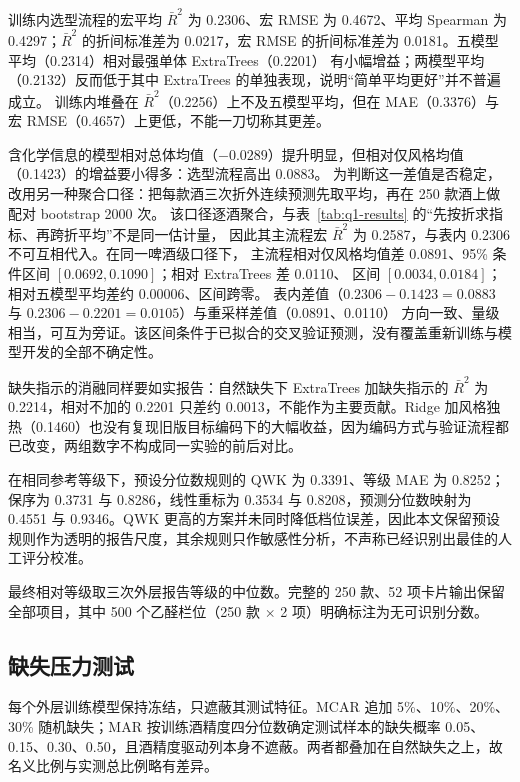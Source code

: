 \documentclass[UTF8,a4paper,zihao=-4]{ctexart}
\numberwithin{figure}{section}
\numberwithin{table}{section}
\numberwithin{equation}{section}
\begin{document}
训练内选型流程的宏平均 $\bar R^2$ 为 0.2306、宏 RMSE 为 0.4672、平均 Spearman 为 0.4297；$\bar R^2$ 
的折间标准差为 0.0217，宏 RMSE 的折间标准差为 0.0181。五模型平均（0.2314）相对最强单体 ExtraTrees（0.2201）
有小幅增益；两模型平均（0.2132）反而低于其中 ExtraTrees 的单独表现，说明“简单平均更好”并不普遍成立。
训练内堆叠在 $\bar R^2$（0.2256）上不及五模型平均，但在 MAE（0.3376）与宏 RMSE（0.4657）上更低，不能一刀切称其更差。

含化学信息的模型相对总体均值（$-0.0289$）提升明显，但相对仅风格均值（0.1423）的增益要小得多：选型流程高出 0.0883。
为判断这一差值是否稳定，改用另一种聚合口径：把每款酒三次折外连续预测先取平均，再在 250 款酒上做配对 bootstrap 2000 次。
该口径逐酒聚合，与表~\ref{tab:q1-results} 的“先按折求指标、再跨折平均”不是同一估计量，
因此其主流程宏 $\bar R^2$ 为 0.2587，与表内 0.2306 不可互相代入。在同一啤酒级口径下，
主流程相对仅风格均值差 0.0891、95\% 条件区间 $[0.0692,0.1090]$；相对 ExtraTrees 差 0.0110、
区间 $[0.0034,0.0184]$；相对五模型平均差约 0.00006、区间跨零。
表内差值（$0.2306-0.1423=0.0883$ 与 $0.2306-0.2201=0.0105$）与重采样差值（0.0891、0.0110）
方向一致、量级相当，可互为旁证。该区间条件于已拟合的交叉验证预测，没有覆盖重新训练与模型开发的全部不确定性。

缺失指示的消融同样要如实报告：自然缺失下 ExtraTrees 加缺失指示的 $\bar R^2$ 为 0.2214，相对不加的 0.2201 只差约 0.0013，不能作为主要贡献。Ridge 加风格独热（0.1460）也没有复现旧版目标编码下的大幅收益，因为编码方式与验证流程都已改变，两组数字不构成同一实验的前后对比。

在相同参考等级下，预设分位数规则的 QWK 为 0.3391、等级 MAE 为 0.8252；保序为 0.3731 与 0.8286，线性重标为 0.3534 与 0.8208，预测分位数映射为 0.4551 与 0.9346。QWK 更高的方案并未同时降低档位误差，因此本文保留预设规则作为透明的报告尺度，其余规则只作敏感性分析，不声称已经识别出最佳的人工评分校准。

最终相对等级取三次外层报告等级的中位数。完整的 250 款、52 项卡片输出保留全部项目，其中 500 个乙醛栏位（250 款 $\times$ 2 项）明确标注为无可识别分数。

\subsection{缺失压力测试}

每个外层训练模型保持冻结，只遮蔽其测试特征。MCAR 追加 5\%、10\%、20\%、30\% 随机缺失；MAR 按训练酒精度四分位数确定测试样本的缺失概率 0.05、0.15、0.30、0.50，且酒精度驱动列本身不遮蔽。两者都叠加在自然缺失之上，故名义比例与实测总比例略有差异。
\end{document}
